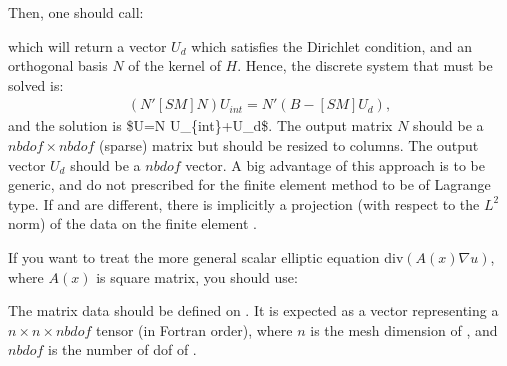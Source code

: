 \documentclass[a4paper,11pt,english]{sphinxmanual}
\begin{document}
Then, one should call:

\begin{sphinxVerbatim}[commandchars=\\\{\}]
     
\end{sphinxVerbatim}

which will return a vector \(U_d\) which satisfies the Dirichlet condition,
and an orthogonal basis \(N\) of the kernel of \(H\). Hence, the discrete
system that must be solved is:
\begin{equation*}
\begin{split}(N'[SM]N) U_{int}=N'(B-[SM]U_d),\end{split}
\end{equation*}
and the solution is \$U=N U\_\{int\}+U\_d\$. The output matrix \(N\) should be a
\(nbdof \times nbdof\) (sparse) matrix but should be resized to 
columns. The output vector \(U_d\) should be a \(nbdof\) vector. A big
advantage of this approach is to be generic, and do not prescribed for the finite
element method  to be of Lagrange type. If  and  are
different, there is implicitly a projection (with respect to the \(L^2\) norm)
of the data on the finite element .

If you want to treat the more general scalar elliptic equation
\(\mbox{div}(A(x)\nabla u)\), where \(A(x)\) is square matrix, you should
use:

\begin{sphinxVerbatim}[commandchars=\\\{\}]
  
                                                  
\end{sphinxVerbatim}

The matrix data  should be defined on . It is expected as a vector
representing a \(n \times n \times nbdof\) tensor (in Fortran order), where
\(n\) is the mesh dimension of , and \(nbdof\) is the number of dof
of .
\end{document}
